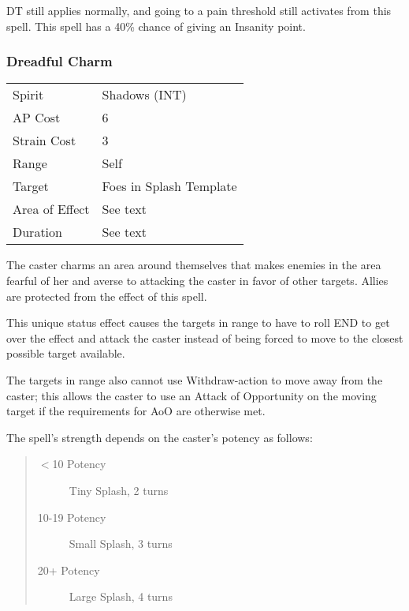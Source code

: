 \documentclass[11pt,a4paper,twocolumn]{book}
\begin{document}
DT still applies normally, and going to a pain threshold still activates from this spell. This spell has a 40\% chance of giving an Insanity point.

\subsubsection*{Dreadful Charm}
{
	\begin{tabu} to 75mm{| X[l,4] | X[l,7] |}
		\hline
		Spirit 			&  Shadows (INT)\\
		AP Cost	      	&  6				\\
		Strain Cost     &  3			\\
		Range     		&  Self	\\
		Target      	&  Foes in Splash Template			\\
		Area of Effect  &  See text	 			\\
		Duration     	&  See text			\\ \hline
	\end{tabu}
	
}

\medskip

The caster charms an area around themselves that makes enemies in the area fearful of her and averse to attacking the caster in favor of other targets. Allies are protected from the effect of this spell.

This unique status effect causes the targets in range to have to roll END to get over the effect and attack the caster instead of being forced to move to the closest possible target available. 

The targets in range also cannot use Withdraw-action to move away from the caster; this allows the caster to use an Attack of Opportunity on the moving target if the requirements for AoO are otherwise met.

The spell's strength depends on the caster's potency as follows: 
\begin{quote}
	\begin{description}
		\item[$<$10 Potency] 	Tiny Splash, 2 turns
		\item[10-19 Potency] 	Small Splash, 3 turns
		\item[20+ Potency]  	Large Splash, 4 turns
	\end{description}	
\end{quote}
\medskip
\end{document}
